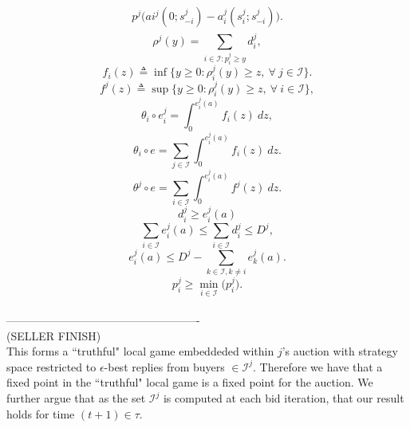 \documentclass[12pt]{article}
\theoremstyle{definition}
\newcommand{\mcI}{\mathcal{I}}
\begin{document}
\begin{multicols}{2}
\begin{align}
\begin{split}
p^j \bigg(ai^j(0; s_{-i}^j)
    -a_i^j(s_i^j;s_{-i}^j)\bigg).
\end{split}
\end{align}
\begin{equation}
    \rho^j(y) = \sum_{i\in\mcI : p_i^j\ge y} d_i^j, 
\end{equation}
\begin{equation}
    f_i(z) \triangleq \inf\big\lbrace y\ge 0:
        \rho_i^j(y) \ge z, \ \forall \ j \in \mcI\big\rbrace.
\end{equation}
\begin{equation}
    f^j(z) \triangleq \sup\big\lbrace y\ge 0:
        \rho_i^j(y) \ge z, \ \forall \ i \in \mcI\big\rbrace,
\end{equation}
\begin{equation}
    \theta_i \circ e_i^j = \int_0^{e_i^j(a)} f_i(z) \ dz,
\end{equation}
\begin{equation}
    \theta_i \circ e = \displaystyle\sum_{j\in\mcI}
 \int_0^{e_i^j(a)} f_i(z) \ dz.
\end{equation}
\begin{equation}
    \theta^j \circ e = \displaystyle\sum_{i\in\mcI}
 \int_0^{e_i^j(a)} f^j(z) \ dz.
\end{equation}
\begin{equation}
    d_i^j \ge e_i^j(a)
\end{equation}
\begin{equation}
    \displaystyle\sum_{i\in\mcI} e_i^j(a) \le \sum_{i\in\mcI} d^j_i \le D^j,
\end{equation}
\begin{equation}
    e_i^j(a) \le D^j - \sum_{k\in\mcI, k\ne i} e_k^j(a).
\end{equation}
\begin{equation}
   p_i^j \ge \min_{i\in\mcI}\big(p_i^j).
\end{equation}
\\----------------------------------------------------\\
(SELLER FINISH)\\
This forms a ``truthful" local game embeddeded within $j$'s auction with strategy space
restricted to $\epsilon$-best replies from buyers $\in \mcI^j$. Therefore we have that a
fixed point in the ``truthful" local game is a fixed point for the auction. We
further argue that as the set $\mcI^j$ is
computed at each bid iteration, that our result holds for time $(t+1) \in \tau$.



\end{multicols}
\end{document}
